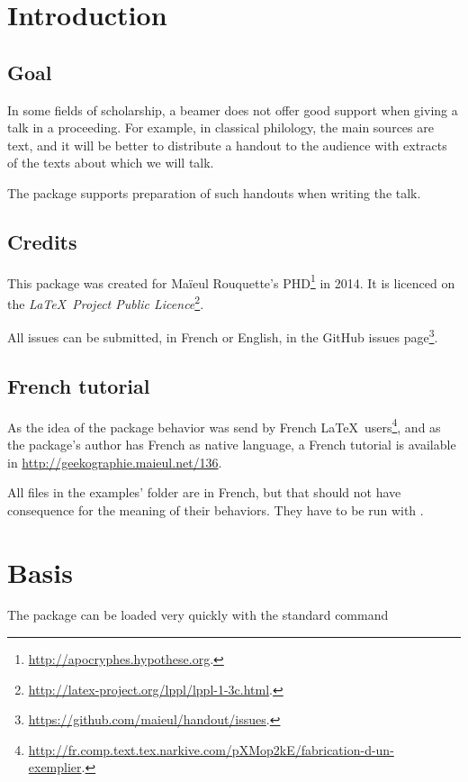 \documentclass{ltxdockit}[2011/03/25]
\begin{document}
\printtitlepage
\tableofcontents

\section{Introduction}
\subsection{Goal}

In some fields of schol­ar­ship, a beamer does not of­fer good sup­port when giv­ing a talk in a pro­ceed­ing. For ex­am­ple, in clas­si­cal philol­ogy, the main sources are text, and it will be bet­ter to dis­tribute a hand­out to the au­di­ence with ex­tracts of the texts about which we will talk.

The pack­age sup­ports prepa­ra­tion of such hand­outs when writ­ing the talk.

\subsection{Credits}

This package was created for Maïeul Rouquette's PHD\footnote{\url{http://apocryphes.hypothese.org}.} in 2014. It is licenced on the \emph{\LaTeX\ Project Public Licence}\footnote{\url{http://latex-project.org/lppl/lppl-1-3c.html}.}.

All issues can be submitted, in French or English, in the GitHub issues page\footnote{\url{https://github.com/maieul/handout/issues}.}.

\subsection{French tutorial}

As the idea of the package behavior was send by French \LaTeX\ users\footnote{\url{http://fr.comp.text.tex.narkive.com/pXMop2kE/fabrication-d-un-exemplier}.}, and as the package's author has French as native language, a French tutorial is available in \url{http://geekographie.maieul.net/136}. 

All files in the examples' folder are in French, but that should not have consequence for the meaning of their behaviors. They  have to be run with \XeLaTeX.


\section{Basis}

The package can be loaded very quickly with the standard command 
\end{document}
